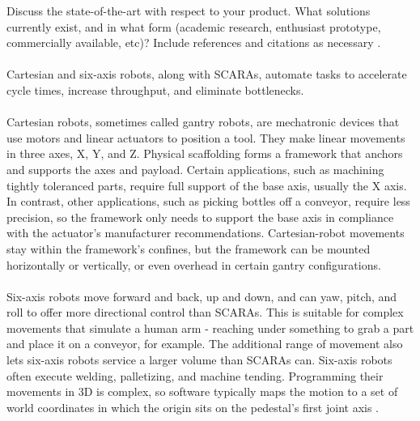 Discuss the state-of-the-art with respect to your product. What solutions currently exist, and in what form (academic research, enthusiast prototype, commercially available, etc)? Include references and citations as necessary \cite{Rubin2012}.
\\
\\
Cartesian and six-axis robots, along with SCARAs, automate tasks to accelerate cycle times, increase throughput, and eliminate bottlenecks.
\\
\\
Cartesian robots, sometimes called gantry robots, are mechatronic devices that use motors and linear actuators to position a tool. They make linear movements in three axes, X, Y, and Z. Physical scaffolding forms a framework that anchors and supports the axes and payload. Certain applications, such as machining tightly toleranced parts, require full support of the base axis, usually the X axis. In contrast, other applications, such as picking bottles off a conveyor, require less precision, so the framework only needs to support the base axis in compliance with the actuator's manufacturer recommendations. Cartesian-robot movements stay within the framework's confines, but the framework can be mounted horizontally or vertically, or even overhead in certain gantry configurations.
\\
\\
Six-axis robots move forward and back, up and down, and can yaw, pitch, and roll to offer more directional control than SCARAs. This is suitable for complex movements that simulate a human arm - reaching under something to grab a part and place it on a conveyor, for example. The additional range of movement also lets six-axis robots service a larger volume than SCARAs can. Six-axis robots often execute welding, palletizing, and machine tending. Programming their movements in 3D is complex, so software typically maps the motion to a set of world coordinates in which the origin sits on the pedestal's first joint axis
\cite{Vaughn2013}.